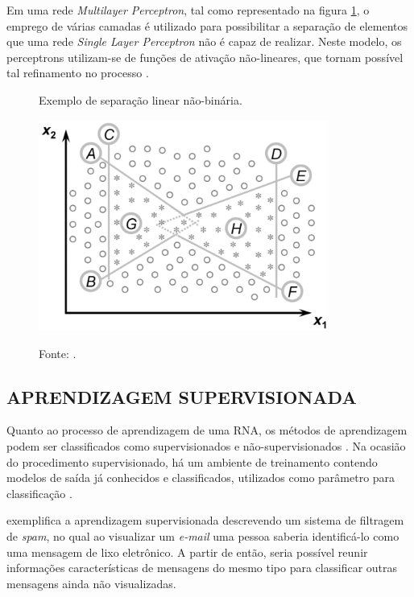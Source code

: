 Em uma rede \textit{Multilayer Perceptron}, tal como representado na figura \ref{figura:multilayer_perceptron}, o emprego de várias camadas é utilizado para possibilitar a separação de elementos que uma rede \textit{Single Layer Perceptron} não é capaz de realizar. Neste modelo, os perceptrons utilizam-se de funções de ativação não-lineares, que tornam possível tal refinamento no processo \cite{marius2009}.

\begin{figure}[H]
	\caption{Exemplo de separação linear não-binária.}
	\centering %
	\includegraphics[width=9.5cm]{resources/multilayer_perceptron.png} %
	\label{figura:multilayer_perceptron}
	\captionsetup{singlelinecheck = false, format= hang, justification=raggedright, labelsep=space, width=9.5cm}
	\caption*{\footnotesize Fonte: .}
\end{figure}

\subsection{APRENDIZAGEM SUPERVISIONADA}

Quanto ao processo de aprendizagem de uma RNA, os métodos de aprendizagem podem ser classificados como supervisionados e não-supervisionados \cite{haykin2007redes}. Na ocasião do procedimento supervisionado, há um ambiente de treinamento contendo modelos de saída já conhecidos e classificados, utilizados como parâmetro para classificação \cite{marius2009}.

 exemplifica a aprendizagem supervisionada descrevendo um sistema de filtragem de \textit{spam}, no qual ao visualizar um \textit{e-mail} uma pessoa saberia identificá-lo como uma mensagem de lixo eletrônico. A partir de então, seria possível reunir informações características de mensagens do mesmo tipo para classificar outras mensagens ainda não visualizadas.


